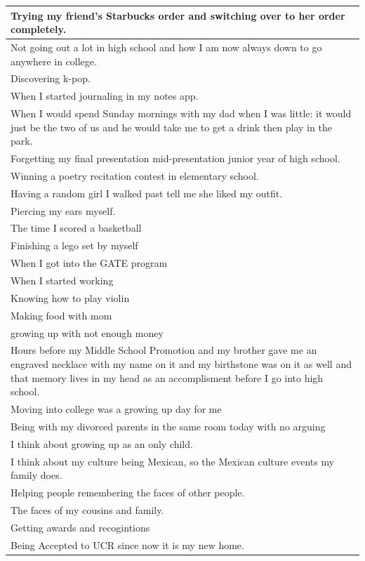 \documentclass[
  .7em,
  letterpaper,
  DIV=11,
  numbers=noendperiod]{scrartcl}
\begin{document}
\begin{table}
\begin{tabular}{l}
\hline
Trying my friend's Starbucks order and switching over to her order completely.\\
\hline
Not going out a lot in high school and how I am now always down to go anywhere in college.\\
\hline
Discovering k-pop.\\
\hline
When I started journaling in my notes app.\\
\hline
When I would spend Sunday mornings with my dad when I was little: it would just be the two of us and he would take me to get a drink then play in the park.\\
\hline
Forgetting my final presentation mid-presentation junior year of high school.\\
\hline
Winning a poetry recitation contest in elementary school.\\
\hline
Having a random girl I walked past tell me she liked my outfit.\\
\hline
Piercing my ears myself.\\
\hline
The time I scored a basketball\\
\hline
Finishing a lego set by myself\\
\hline
When I got into the GATE program\\
\hline
When I started working\\
\hline
Knowing how to play violin\\
\hline
Making food with mom\\
\hline
growing up with not enough money\\
\hline
Hours before my Middle School Promotion and my brother gave me an engraved necklace with my name on it and my birthstone was on it as well and that memory lives in my head as an accomplisment before I go into high school.\\
\hline
Moving into college was a growing up day for me\\
\hline
Being with my divorced parents in the same room today with no arguing\\
\hline
I think about growing up as an only child.\\
\hline
I think about my culture being Mexican, so the Mexican culture events my family does.\\
\hline
Helping people remembering the faces of other people.\\
\hline
The faces of my cousins and family.\\
\hline
Getting awards and recogintions\\
\hline
Being Accepted to UCR since now it is my new home.\\

\end{tabular}
\end{table}
\end{document}
